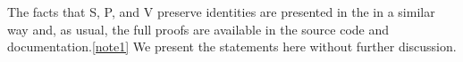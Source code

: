 \documentclass[a4paper,UKenglish,cleveref,autoref,thm-restate]{lipics-v2021}
\begin{document}
The facts that \ad S, \ad P, and \ad V preserve identities are presented in the \ualib in a similar way and, as usual, the full proofs are available in the \ualib source code and documentation.\cref{note1} We present the statements here without further discussion.
\ccpad
\begin{code}[number=code:S1]%
  
\end{code}
\ccpad
\begin{code}%
  
\end{code}
\ccpad
\begin{code}%
  
\end{code}



\begin{comment}
\subsubsection{Class identities}\label{class-identities}
It follows from \af{V-id1} that, if \ab 𝒦 is a class of structures, then the collection of identities modeled by all structures in \ab 𝒦 is precisely the collection of identities modeled by all structures in \af V \ab 𝒦.  The latter is denoted \AgdaFunction{Th}(\AgdaDatatype{V} \AgdaBound{𝒦}).
\ccpad
\begin{code}%
  
\end{code}
\end{comment}
\end{document}
